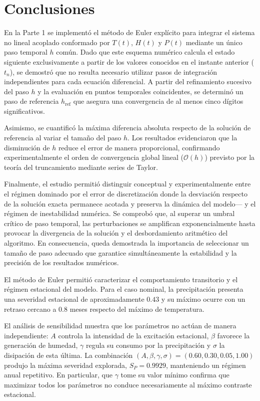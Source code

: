 \section{Conclusiones}

En la Parte 1 se implementó el método de Euler explícito para integrar el sistema no lineal acoplado conformado por $T(t)$, $H(t)$ y $P(t)$ mediante un único paso temporal $h$ común. Dado que este esquema numérico calcula el estado siguiente exclusivamente a partir de los valores conocidos en el instante anterior ($t_n$), se demostró que no resulta necesario utilizar pasos de integración independientes para cada ecuación diferencial. A partir del refinamiento sucesivo del paso $h$ y la evaluación en puntos temporales coincidentes, se determinó un paso de referencia $h_{\text{ref}}$ que asegura una convergencia de al menos cinco dígitos significativos.

Asimismo, se cuantificó la máxima diferencia absoluta respecto de la solución de referencia al variar el tamaño del paso $h$. Los resultados evidenciaron que la disminución de $h$ reduce el error de manera proporcional, confirmando experimentalmente el orden de convergencia global lineal ($\mathcal{O}(h)$) previsto por la teoría del truncamiento mediante series de Taylor.

Finalmente, el estudio permitió distinguir conceptual y experimentalmente entre el régimen dominado por el error de discretización donde la desviación respecto de la solución exacta permanece acotada y preserva la dinámica del modelo--- y el régimen de inestabilidad numérica. Se comprobó que, al superar un umbral crítico de paso temporal, las perturbaciones se amplifican exponencialmente hasta provocar la divergencia de la solución y el desbordamiento aritmético del algoritmo. En consecuencia, queda demostrada la importancia de seleccionar un tamaño de paso adecuado que garantice simultáneamente la estabilidad y la precisión de los resultados numéricos.

El método de Euler permitió caracterizar el comportamiento transitorio y el
régimen estacional del modelo. Para el caso nominal, la precipitación presenta
una severidad estacional de aproximadamente $0.43$ y su máximo ocurre con un
retraso cercano a $0.8$ meses respecto del máximo de temperatura.

El análisis de sensibilidad muestra que los parámetros no actúan de manera
independiente: $A$ controla la intensidad de la excitación estacional,
$\beta$ favorece la generación de humedad, $\gamma$ regula su consumo por la
precipitación y $\sigma$ la disipación de esta última. La combinación
$(A,\beta,\gamma,\sigma)=(0.60,0.30,0.05,1.00)$ produjo la máxima severidad
explorada, $S_P=0.9929$, manteniendo un régimen anual repetitivo. En
particular, que $\gamma$ tome su valor mínimo confirma que maximizar todos los
parámetros no conduce necesariamente al máximo contraste estacional.


